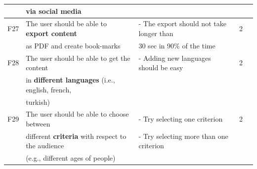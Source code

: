 {\begin{landscape}
\begin{center}
\begin{longtable}{|l|l|lll|}
		& via social media									&		& \\
	\hline
	F27 & The user should be able to \textbf{export content} 		& - The export should not take longer than  & 2\\
		& as PDF and create book-marks						& 30 sec in 90\% of the time	& \\
	\hline
	F28 & The user should be able to get the content 				& - Adding new languages should be easy  & 2\\
		& in \textbf{different languages} (i.e., english, french, 		&	& \\
		& turkish) 										&	& \\
	\hline
	F29 & The user should be able to choose between  			& - Try selecting one criterion & 2\\
		& different \textbf{criteria} with respect to the audience 		& - Try selecting more than one criterion	& \\
		& (e.g., different ages of people) 						&	& \\
\end{longtable}
\end{center} 
    \end{landscape}
    \clearpage%
}

\clearpage

